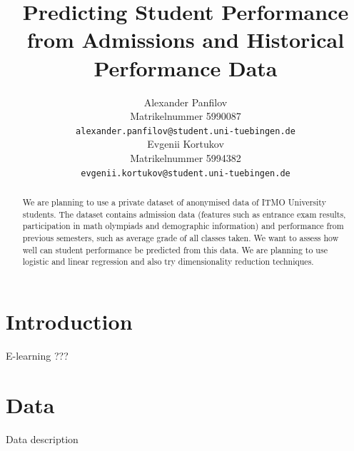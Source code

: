 \documentclass{article}
\title{Predicting Student Performance\\ from Admissions and Historical Performance Data}
\author{%
  Alexander Panfilov\\
  Matrikelnummer 5990087\\
  \texttt{alexander.panfilov@student.uni-tuebingen.de} \\
  \And
  Evgenii Kortukov\\
  Matrikelnummer 5994382\\
  \texttt{evgenii.kortukov@student.uni-tuebingen.de} \\
}
\begin{document}
\maketitle

\begin{abstract}
   We are planning to use a private dataset of anonymised data of ITMO University
   students. The dataset contains admission data (features such as entrance exam results,
   participation in math olympiads and demographic information) and performance from 
   previous semesters, such as average grade of all classes taken. We want to assess how well
   can student performance be predicted from this data. We are planning to use logistic and
   linear regression and also try dimensionality reduction techniques.
\end{abstract}

\section{Introduction}
E-learning ???

\section{Data}
Data description
\end{document}
